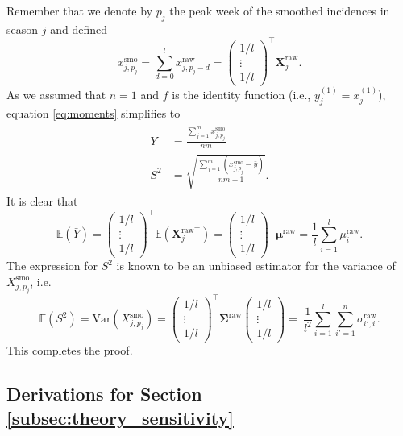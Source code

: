 \documentclass{article}
\begin{document}
Remember that we denote by $p_j$ the peak week of the smoothed incidences in season $j$ and defined
$$
x^\text{smo}_{j, p_j} = \sum_{d = 0}^l x^\text{raw}_{j, p_j - d} = \begin{pmatrix} 1/l \\ \vdots \\ 1/l \end{pmatrix}^\top \mathbf{X}^{\text{raw}}_j.
$$
As we assumed that $n = 1$ and $f$ is the identity function (i.e., $y_j^{(1)} = x_j^{(1)}$), equation \eqref{eq:moments} simplifies to
\begin{align}
\begin{split}
\bar{Y} & = \frac{\sum_{j = 1}^m x_{j, p_j}^\text{smo}}{nm}\\
S^2 & = \sqrt{ \frac{\sum_{j = 1}^m (x_{j, p_j}^\text{smo}  - \bar{y})}{nm - 1}}.
\end{split}
\end{align}
It is clear that
$$
\mathbb{E}(\bar{Y}) = \begin{pmatrix} 1/l \\ \vdots \\ 1/l \end{pmatrix}^\top \mathbb{E}(\mathbf{X}^{\text{raw} \top}_j) = \begin{pmatrix} 1/l \\ \vdots \\ 1/l \end{pmatrix}^\top \boldsymbol{\mu}^\text{raw} = \frac{1}{l}\sum_{i = 1}^l \mu^\text{raw}_i.
$$
The expression for $S^2$ is known to be an unbiased estimator for the variance of $X_{j, p_j}^\text{smo}$, i.e.
$$
\mathbb{E}(S^2) = \text{Var}(X_{j, p_j}^\text{smo}) = \begin{pmatrix} 1/l \\ \vdots \\ 1/l \end{pmatrix}^\top \mathbf{\Sigma}^\text{raw} \begin{pmatrix} 1/l \\ \vdots \\ 1/l \end{pmatrix} = \ \frac{1}{l^2} \sum_{i = 1}^l \sum_{i' = 1}^n \sigma^\text{raw}_{i', i}.
$$
This completes the proof.

\subsection{Derivations for Section \ref{subsec:theory_sensitivity}}
\end{document}
